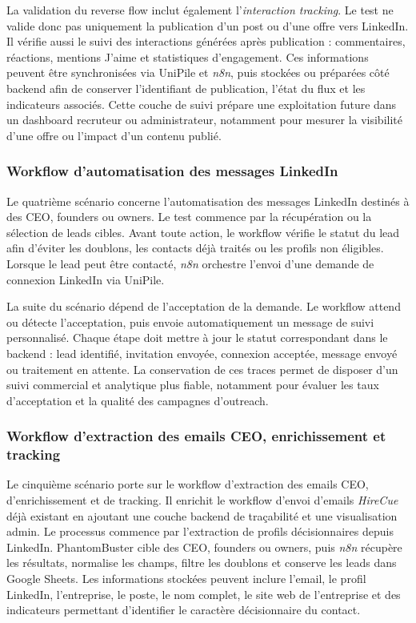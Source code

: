 La validation du reverse flow inclut également l'\textit{interaction tracking}. Le test ne valide donc pas uniquement la publication d'un post ou d'une offre vers LinkedIn. Il vérifie aussi le suivi des interactions générées après publication : commentaires, réactions, mentions J'aime et statistiques d'engagement. Ces informations peuvent être synchronisées via UniPile et \textit{n8n}, puis stockées ou préparées côté backend afin de conserver l'identifiant de publication, l'état du flux et les indicateurs associés. Cette couche de suivi prépare une exploitation future dans un dashboard recruteur ou administrateur, notamment pour mesurer la visibilité d'une offre ou l'impact d'un contenu publié.

\subsubsection{Workflow d'automatisation des messages LinkedIn}

Le quatrième scénario concerne l'automatisation des messages LinkedIn destinés à des CEO, founders ou owners. Le test commence par la récupération ou la sélection de leads cibles. Avant toute action, le workflow vérifie le statut du lead afin d'éviter les doublons, les contacts déjà traités ou les profils non éligibles. Lorsque le lead peut être contacté, \textit{n8n} orchestre l'envoi d'une demande de connexion LinkedIn via UniPile.

La suite du scénario dépend de l'acceptation de la demande. Le workflow attend ou détecte l'acceptation, puis envoie automatiquement un message de suivi personnalisé. Chaque étape doit mettre à jour le statut correspondant dans le backend : lead identifié, invitation envoyée, connexion acceptée, message envoyé ou traitement en attente. La conservation de ces traces permet de disposer d'un suivi commercial et analytique plus fiable, notamment pour évaluer les taux d'acceptation et la qualité des campagnes d'outreach.

\subsubsection{Workflow d'extraction des emails CEO, enrichissement et tracking}

Le cinquième scénario porte sur le workflow d'extraction des emails CEO, d'enrichissement et de tracking. Il enrichit le workflow d'envoi d'emails \textit{HireCue} déjà existant en ajoutant une couche backend de traçabilité et une visualisation admin. Le processus commence par l'extraction de profils décisionnaires depuis LinkedIn. PhantomBuster cible des CEO, founders ou owners, puis \textit{n8n} récupère les résultats, normalise les champs, filtre les doublons et conserve les leads dans Google Sheets. Les informations stockées peuvent inclure l'email, le profil LinkedIn, l'entreprise, le poste, le nom complet, le site web de l'entreprise et des indicateurs permettant d'identifier le caractère décisionnaire du contact.

